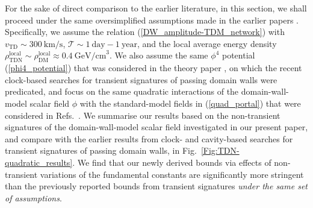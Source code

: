 \documentclass[aps,prd,onecolumn,nofootinbib]{revtex4-2} %
\begin{document}
For the sake of direct comparison to the earlier literature, in this section, we shall proceed under the same oversimplified assumptions made in the earlier papers \cite{Derevianko_2014_TDM-clocks,Wcislo_2016_TDM-cavity,Roberts_2017_TDM-GPS,Wcislo_2018_TDM-cavity,Roberts_2019_TDM-clocks}. 
Specifically, we assume the relation (\ref{DW_amplitude-TDM_network}) with $v_\textrm{TD} \sim 300~\textrm{km/s}$, $\mathcal{T} \sim 1~\textrm{day} - 1~\textrm{year}$, and the local average energy density $\rho_\textrm{TDN}^\textrm{local} \sim \rho_\textrm{DM}^\textrm{local} \approx 0.4~\textrm{GeV/cm}^3$. 
We also assume the same $\phi^4$ potential (\ref{phi4_potential}) that was considered in the theory paper \cite{Derevianko_2014_TDM-clocks}, on which the recent clock-based searches for transient signatures of passing domain walls were predicated, and focus on the same quadratic interactions of the domain-wall-model scalar field $\phi$ with the standard-model fields in (\ref{quad_portal}) that were considered in Refs.~\cite{Derevianko_2014_TDM-clocks,Wcislo_2016_TDM-cavity,Roberts_2017_TDM-GPS,Wcislo_2018_TDM-cavity,Roberts_2019_TDM-clocks}. 
We summarise our results based on the non-transient signatures of the domain-wall-model scalar field investigated in our present paper, and compare with the earlier results from clock- and cavity-based searches for transient signatures of passing domain walls, in Fig.~\ref{Fig:TDN-quadratic_results}. 
We find that our newly derived bounds via effects of non-transient variations of the fundamental constants are significantly more stringent than the previously reported bounds from transient signatures \textit{under the same set of assumptions}. 
\end{document}
